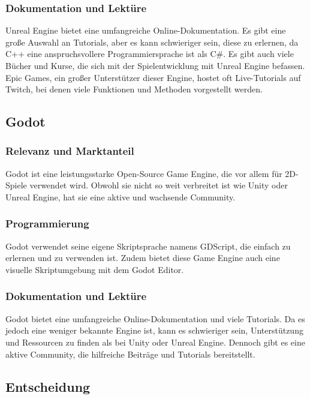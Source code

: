 \subsubsection{Dokumentation und Lektüre}
Unreal Engine bietet eine umfangreiche Online-Dokumentation. Es gibt eine große Auswahl an Tutorials, aber es kann schwieriger sein, diese zu erlernen, da C++ eine anspruchsvollere Programmiersprache ist als C\#. Es gibt auch viele Bücher und Kurse, die sich mit der Spielentwicklung mit Unreal Engine befassen. Epic Games, ein großer Unterstützer dieser Engine, hostet oft Live-Tutorials auf Twitch, bei denen viele Funktionen und Methoden vorgestellt werden.

\pagebreak

\subsection{Godot}
\subsubsection{Relevanz und Marktanteil}
Godot ist eine leistungsstarke Open-Source Game Engine, die vor allem für 2D-Spiele verwendet wird. Obwohl sie nicht so weit verbreitet ist wie Unity oder Unreal Engine, hat sie eine aktive und wachsende Community.

\subsubsection{Programmierung}
Godot verwendet seine eigene Skriptsprache namens GDScript, die einfach zu erlernen und zu verwenden ist. Zudem bietet diese Game Engine auch eine visuelle Skriptumgebung mit dem Godot Editor.

\subsubsection{Dokumentation und Lektüre}
Godot bietet eine umfangreiche Online-Dokumentation und viele Tutorials. Da es jedoch eine weniger bekannte Engine ist, kann es schwieriger sein, Unterstützung und Ressourcen zu finden als bei Unity oder Unreal Engine. Dennoch gibt es eine aktive Community, die hilfreiche Beiträge und Tutorials bereitstellt.

\pagebreak

\subsection{Entscheidung}
